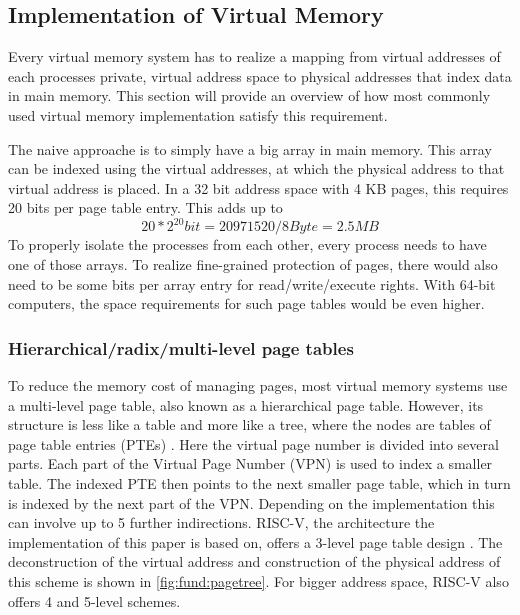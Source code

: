 \subsection{Implementation of Virtual Memory}
Every virtual memory system has to realize a mapping from virtual addresses of each processes
private, virtual address space to physical addresses that index data in main memory.
This section will provide an overview of how most commonly used virtual memory implementation satisfy
this requirement.


The naive approache is to simply have a big array in main memory. This array can be indexed
using the virtual addresses, at which the physical address to that virtual address is placed.
In a 32 bit address space with 4 KB pages, this requires 20 bits per page table entry. This
adds up to \[ 20 * 2^{20} bit = 20971520 / 8 Byte = 2.5 MB \]
To properly isolate the processes from each other, every process needs to have one of those arrays.
To realize fine-grained protection of pages, there would also need to be some bits per array entry
for read/write/execute rights.
With 64-bit computers, the space requirements for such page tables would be even higher.

\subsubsection{Hierarchical/radix/multi-level page tables}
To reduce the memory cost of managing pages, most  virtual memory systems use a
multi-level page table, also known as a hierarchical page table. However, its structure
is less like a table and more like a tree, where the nodes are tables of page table entries (PTEs) \cite{tanenbaumOS}.
Here the virtual page number is divided into several parts. Each part of the Virtual Page Number (VPN)
is used to index a smaller table. The indexed PTE then points to the next smaller page table,
which in turn is indexed by the next part of the VPN. Depending on the implementation
this can involve up to 5 further indirections.
RISC-V, the architecture the implementation of this paper is based on, offers a 3-level page table
design \cite{riscvreader}.
The deconstruction of the virtual address and construction of the physical address of this
scheme is shown in \ref{fig:fund:pagetree}.
For bigger address space, RISC-V also offers 4 and 5-level schemes.

